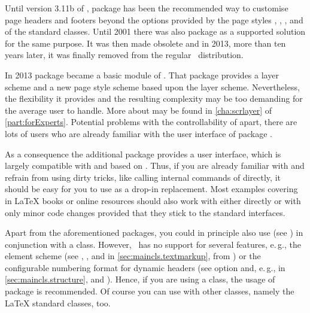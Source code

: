 Until version 3.11b of \KOMAScript, package  has been the
recommended way to customise page headers and footers beyond the options
provided by the page styles , ,
, and  of the standard \KOMAScript{}
classes.  Until 2001 there was also package  as a supported
solution for the same purpose. It was then made obsolete and in 2013, more
than ten years later, it was finally removed from the regular
\KOMAScript~distribution.

In 2013 package  became a basic
module of \KOMAScript. That package provides a layer scheme and a new page
style scheme based upon the layer scheme. Nevertheless, the flexibility it
provides and the resulting complexity may be too demanding for the average
user to handle.  More about  may be found in
\autoref{cha:scrlayer} of \autoref{part:forExperts}. Potential problems with
the controllability of  apart, there are lots of users who
are already familiar with the user interface of package .

As a consequence the additional package  provides a
user interface, which is largely compatible with  and based
on . Thus, if you are already familiar with 
and refrain from using dirty tricks, like calling internal commands of 
 directly, it should be easy for you to use 
 as a drop-in replacement. Most examples covering 
 in \LaTeX{} books or online resources should also work 
with  either directly or with only minor
code changes provided that they stick to the standard interfaces. 

Apart from the aforementioned \KOMAScript{} packages, you could in principle
also use  (see
\cite{package:fancyhdr}) in conjunction with a \KOMAScript{} class. However,
\ has no support for several \KOMAScript{} features, e.\,g.,
the element scheme (see , , and
 in \autoref{sec:maincls.textmarkup}, from
) or the configurable numbering
format for dynamic headers (see option  and, e.\,g.,
 in \autoref{sec:maincls.structure},
 and
). Hence, if you are using a
\KOMAScript{} class, the usage of package  is
recommended. Of course you can use  with other
classes, namely the \LaTeX{} standard classes, too.

